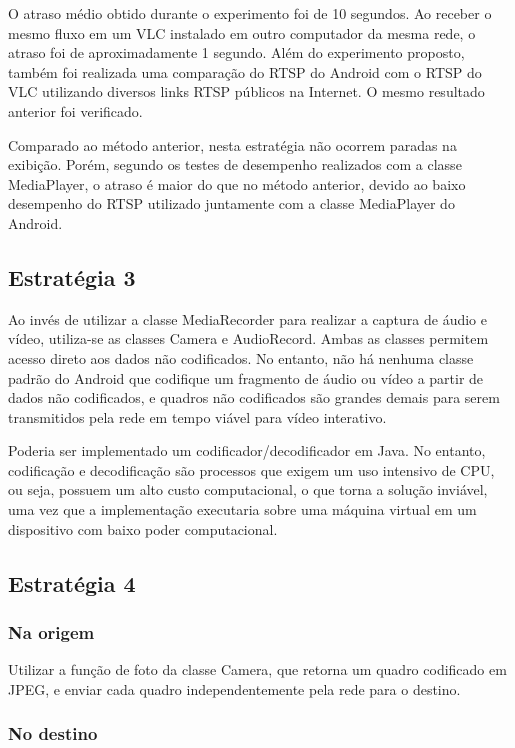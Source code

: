 \documentclass{acm_proc_article-sp}
\begin{document}
O atraso médio obtido durante o experimento foi de 10 segundos. Ao receber o mesmo fluxo em um VLC instalado em outro computador da mesma rede, o atraso foi de aproximadamente 1 segundo. Além do experimento proposto, também foi realizada uma comparação do RTSP do Android com o RTSP do VLC utilizando diversos links RTSP públicos na Internet. O mesmo resultado anterior foi verificado.

Comparado ao método anterior, nesta estratégia não ocorrem paradas na exibição. Porém, segundo os testes de desempenho realizados com a classe MediaPlayer, o atraso é maior do que no método anterior, devido ao baixo desempenho do RTSP utilizado juntamente com a classe MediaPlayer do Android.

\subsection{Estratégia 3}

Ao invés de utilizar a classe MediaRecorder para realizar a captura de áudio e vídeo, utiliza-se as classes Camera e AudioRecord. Ambas as classes permitem acesso direto aos dados não codificados. No entanto, não há nenhuma classe padrão do Android que codifique um fragmento de áudio ou vídeo a partir de dados não codificados, e quadros não codificados são grandes demais para serem transmitidos pela rede em tempo viável para vídeo interativo. 

Poderia ser implementado um codificador/decodificador em Java. No entanto, codificação e decodificação são processos que exigem um uso intensivo de CPU, ou seja, possuem um alto custo computacional, o que torna a solução inviável, uma vez que a implementação executaria sobre uma máquina virtual em um dispositivo com baixo poder computacional.

\subsection{Estratégia 4}

\subsubsection{Na origem}

Utilizar a função de foto da classe Camera, que retorna um quadro codificado em JPEG, e enviar cada quadro independentemente pela rede para o destino.

\subsubsection{No destino}
\end{document}
